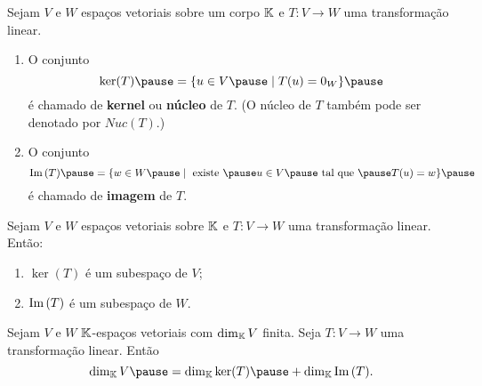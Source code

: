 \documentclass{beamer}
\begin{document}
\begin{frame}
    \begin{definicao}
        Sejam $V$ e $W$ espaços vetoriais sobre um corpo $\mathbb{K}$ \pause e $T \colon V \to W$ uma transformação linear.\pause
        \begin{enumerate}[label={\roman*})]
            \item O conjunto\pause
            \[
            \ker(T) \pause = \{u \in V \pause \mid T(u) = 0_W\}\pause
            \]
            é chamado de \textbf{kernel} \pause ou \textbf{núcleo} de $T$. \pause (O núcleo de $T$ também pode ser denotado por $Nuc(T)$.)\pause

            \vspace*{1.5cm}

            \item O conjunto\pause
            \[
            \im(T) \pause = \{w \in W \pause \mid \mbox{ existe } \pause u \in V \pause \mbox{ tal que } \pause T(u) = w\}\pause
            \]
            é chamado de \textbf{imagem} de $T$.
        \end{enumerate}
    \end{definicao}
\end{frame}

\begin{frame}

    \begin{proposicao}
        Sejam $V$ e $W$ espaços vetoriais sobre $\mathbb{K}$ \pause e $T \colon V \to W$ uma transformação linear. \pause Então:\pause
        \begin{enumerate}[label={\roman*})]
            \item $\ker(T)$ \pause é um subespaço de $V$;\pause

            \vspace*{1cm}

            \item ${\rm Im\,}(T)$ \pause é um subespaço de $W$.
        \end{enumerate}
    \end{proposicao}
\end{frame}

\begin{frame}
    \begin{teorema}\label{teorema_do_nucleo_e_da_imagem}
        Sejam $V$ e $W$ $\mathbb{K}$-espa\c{c}os vetoriais \pause com $\dim_{\mathbb{K}}V$ finita. \pause Seja $T \colon V \to W$ uma transforma\c{c}\~ao linear. \pause Ent\~ao
        \[
            \dim_\cp{K}V \pause = \dim_\cp{K}\ker(T) \pause + \dim_\cp{K}\im(T).
        \]
    \end{teorema}
\end{frame}
\end{document}
